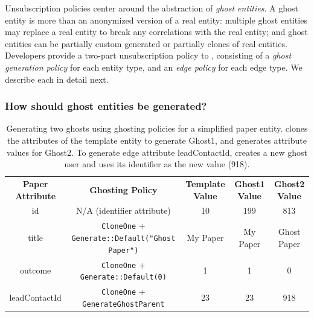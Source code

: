 Unsubscription policies center around the abstraction of \emph{ghost entities}. A ghost entity is
more than an anonymized version of a real entity: multiple ghost
entities may replace a real entity to break any correlations with the real entity; and ghost entities can be
partially custom generated or partially clones of real entities.
Developers provide a two-part unsubscription policy to \sys, consisting of a \emph{ghost
generation policy} for each entity type, and an \emph{edge policy} for each edge type. We describe each in detail next.

\subsubsection{How should ghost entities be generated?}
\label{sec:ghosting}

\begin{table}[t!]
    \centering
    \footnotesize
\begin{tabular}{@{}ccccc@{}}
\textbf{Paper Attribute} & \textbf{Ghosting Policy} & \textbf{Template Value} & \textbf{Ghost1 Value} & \textbf{Ghost2 Value} 
  \\ \cmidrule(r){1-5}
    {id} & N/A (identifier attribute) & 10 & 199 & 813 \\
{title} & \texttt{CloneOne} + \texttt{Generate::Default("Ghost Paper")} & My Paper & My
    Paper & Ghost Paper \\
{outcome} & \texttt{CloneOne} + \texttt{Generate::Default(0)} & 1 & 1 & 0 \\
{leadContactId} & \texttt{CloneOne} + \texttt{GenerateGhostParent} & 23 & 23 & 918 \\
\end{tabular}
    \caption{Generating two ghosts using ghosting policies for a simplified paper entity.
    \sys clones the attributes of the template entity to generate Ghost1, and generates
    attribute values for Ghost2. To generate edge attribute leadContactId, \sys creates a new ghost user and uses its identifier as the new value (918).}
    \label{tab:ghosting}
\end{table}

